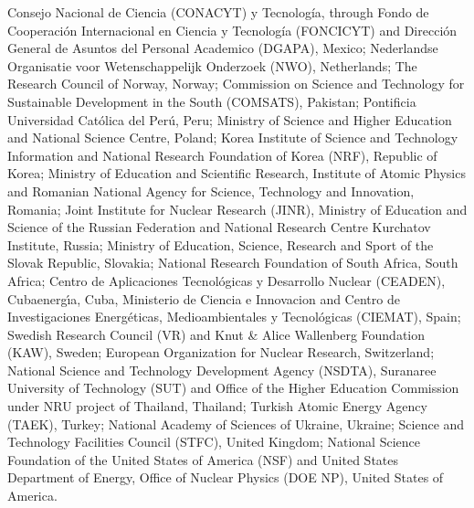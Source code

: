 %
Consejo Nacional de Ciencia (CONACYT) y Tecnolog\'{i}a, through Fondo de Cooperaci\'{o}n Internacional en Ciencia y Tecnolog\'{i}a (FONCICYT) and Direcci\'{o}n General de Asuntos del Personal Academico (DGAPA), Mexico;
%
Nederlandse Organisatie voor Wetenschappelijk Onderzoek (NWO), Netherlands;
%
The Research Council of Norway, Norway;
%
Commission on Science and Technology for Sustainable Development in the South (COMSATS), Pakistan;
%
Pontificia Universidad Cat\'{o}lica del Per\'{u}, Peru;
%
Ministry of Science and Higher Education and National Science Centre, Poland;
%
Korea Institute of Science and Technology Information and National Research Foundation of Korea (NRF), Republic of Korea;
%
Ministry of Education and Scientific Research, Institute of Atomic Physics and Romanian National Agency for Science, Technology and Innovation, Romania;
%
Joint Institute for Nuclear Research (JINR), Ministry of Education and Science of the Russian Federation and National Research Centre Kurchatov Institute, Russia;
%
Ministry of Education, Science, Research and Sport of the Slovak Republic, Slovakia;
%
National Research Foundation of South Africa, South Africa;
%
Centro de Aplicaciones Tecnol\'{o}gicas y Desarrollo Nuclear (CEADEN), Cubaenerg\'{\i}a, Cuba, Ministerio de Ciencia e Innovacion and Centro de Investigaciones Energ\'{e}ticas, Medioambientales y Tecnol\'{o}gicas (CIEMAT), Spain;
%
Swedish Research Council (VR) and Knut \& Alice Wallenberg Foundation (KAW), Sweden;
%
European Organization for Nuclear Research, Switzerland;
%
National Science and Technology Development Agency (NSDTA), Suranaree University of Technology (SUT) and Office of the Higher Education Commission under NRU project of Thailand, Thailand;
%
Turkish Atomic Energy Agency (TAEK), Turkey;
%
National Academy of  Sciences of Ukraine, Ukraine;
%
Science and Technology Facilities Council (STFC), United Kingdom;
%
National Science Foundation of the United States of America (NSF) and United States Department of Energy, Office of Nuclear Physics (DOE NP), United States of America.
